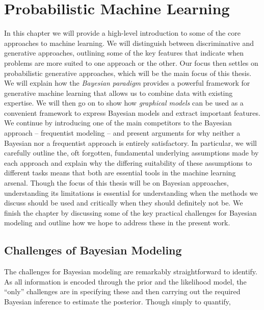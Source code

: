 %
%	


\chapter{Probabilistic Machine Learning}
\label{chp:bayes}

In this chapter we will provide a high-level introduction to  some of the core approaches to
machine learning.  We will distinguish between discriminative and generative approaches,
outlining some of the key features that indicate when problems are more suited to one approach
or the other.  Our focus then settles on probabilistic generative approaches, which
will be the main focus of this thesis.  We will explain how the \emph{Bayesian paradigm} provides
a powerful framework for generative machine learning that allows us to combine data with existing
expertise.  We will then go on to show how \emph{graphical models} can be used as a convenient
framework to express Bayesian models and extract important features.  
We continue by introducing one of the main competitors to the Bayesian approach -- frequentist
modeling -- and present arguments for why neither a Bayesian nor a frequentist approach is
entirely satisfactory.  In particular, we will carefully outline the, oft forgotten, fundamental underlying
assumptions made by each approach and explain why the differing suitability of these
assumptions to different tasks means that both are  essential tools in the machine learning
arsenal.
Though the focus of this thesis will be on Bayesian approaches, understanding its limitations
is essential for understanding when the methods we discuss should be used and critically when they
should definitely not be.  We finish the chapter by discussing some of the key practical challenges for Bayesian modeling and outline how we hope to address these in the present
work.







\section{Challenges of Bayesian Modeling}
\label{sec:bayes:challenges}

The challenges for Bayesian modeling are remarkably straightforward to identify.  As all information
is encoded through the prior and the likelihood model, the ``only'' challenges are in specifying these
and then carrying out the required Bayesian inference to estimate the posterior.  Though simply to
quantify, 